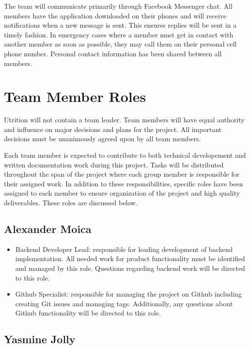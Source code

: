 \documentclass{article}
\begin{document}
The team will communicate primarily through Facebook Messenger chat. All members have the application downloaded on their phones and will receive notifications when a new message is sent. This ensures replies will be sent in a timely fashion. In emergency cases where a member must get in contact with another member as soon as possible, they may call them on their personal cell phone number. Personal contact information has been shared between all members.

\section{Team Member Roles}

Utrition will not contain a team leader. Team members will have equal authority and influence on major decisions and plans for the project. All important decisions must be unanimously agreed upon by all team members.

Each team member is expected to contribute to both technical developement and written documentation work during this project. Tasks will be distributed throughout the span of the project where each group member is responsible for their assigned work. In addition to these responsibilities, specific roles have been assigned to each member to ensure organization of the project and high quality deliverables. These roles are discussed below. 

\subsection{Alexander Moica}

\begin{itemize}
	\item Backend Developer Lead: responsible for leading development of backend implementation. All needed work for product functionality must be identified and managed by this role. Questions regarding backend work will be directed to this role.
	\item Github Specialist: responsible for managing the project on Github including creating Git issues and managing tags. Additionally, any questions about Github functionality will be directed to this role.
\end{itemize}

\subsection{Yasmine Jolly}
\end{document}
